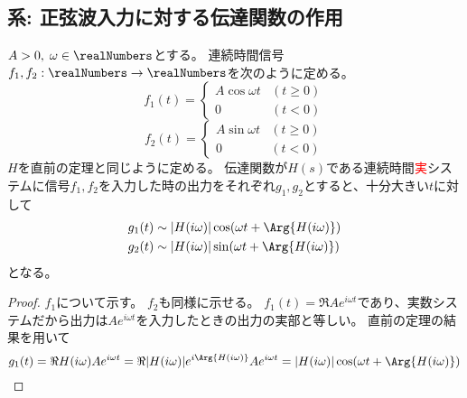 		\subsection{系: 正弦波入力に対する伝達関数の作用}
			\begin{shadebox}
				$A>0,\;\omega \in \realNumbers$とする。
				連続時間信号$f_1,f_2: \realNumbers \to \realNumbers$を次のように定める。
				\[
					f_1(t) =
					\begin{cases}
						A\cos\omega t & (t\geq 0) \\
						0 & (t<0)
					\end{cases}
				\]
				\[
					f_2(t) =
					\begin{cases}
						A\sin\omega t & (t\geq 0) \\
						0 & (t<0)
					\end{cases}
				\]
				$H$を直前の定理と同じように定める。
				伝達関数が$H(s)$である連続時間\textcolor{red}{実}システムに信号$f_1,f_2$を入力した時の出力をそれぞれ$g_1,g_2$とすると、十分大きい$t$に対して
				\begin{align*}
					g_1(t) &\sim |H(i\omega)|\cos(\omega t + \Arg{H(i\omega)}) \\
					g_2(t) &\sim |H(i\omega)|\sin(\omega t + \Arg{H(i\omega)})
				\end{align*}
				となる。
			\end{shadebox}
			\begin{proof}
				\quad\par
				$f_1$について示す。
				$f_2$も同様に示せる。
				$f_1(t) = \Re{Ae^{i\omega t}}$であり、実数システムだから出力は$Ae^{i\omega t}$を入力したときの出力の実部と等しい。
				直前の定理の結果を用いて
				\[ g_1(t) = \Re{H(i\omega)Ae^{i\omega t}} = \Re{|H(i\omega)|e^{i\Arg{H(i\omega)}}Ae^{i\omega t}} = |H(i\omega)|\cos (\omega t + \Arg{H(i\omega)}) \]
			\end{proof}
